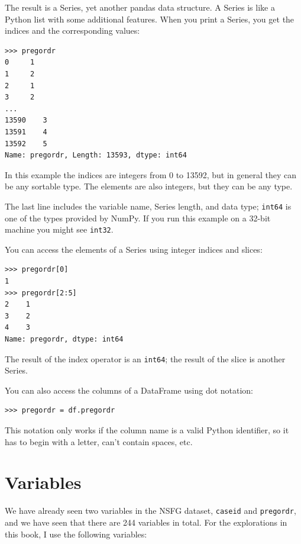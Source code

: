 \documentclass[12pt]{book}
\begin{document}
The result is a Series, yet another pandas data structure.
A Series is like a Python list with some additional features.
When you print a Series, you get the indices and the
corresponding values:

\begin{verbatim}
>>> pregordr
0     1
1     2
2     1
3     2
...
13590    3
13591    4
13592    5
Name: pregordr, Length: 13593, dtype: int64
\end{verbatim}

In this example the indices are integers from 0 to 13592, but in
general they can be any sortable type.  The elements
are also integers, but they can be any type.

The last line includes the variable name, Series length, and data type;
\verb"int64" is one of the types provided by NumPy.  If you run
this example on a 32-bit machine you might see \verb"int32".

You can access the elements of a Series using integer indices
and slices:

\begin{verbatim}
>>> pregordr[0]
1
>>> pregordr[2:5]
2    1
3    2
4    3
Name: pregordr, dtype: int64
\end{verbatim}

The result of the index operator is an \verb"int64"; the
result of the slice is another Series.

You can also access the columns of a DataFrame using dot notation:

\begin{verbatim}
>>> pregordr = df.pregordr
\end{verbatim}

This notation only works if the column name is a valid Python
identifier, so it has to begin with a letter, can't contain spaces, etc.


\section{Variables}

We have already seen two variables in the NSFG dataset, \verb"caseid"
and \verb"pregordr", and we have seen that there are 244 variables in
total.  For the explorations in this book, I use the following
variables:
\end{document}
